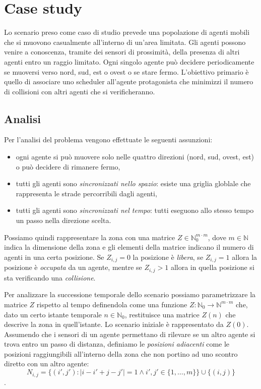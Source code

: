 
\chapter{Case study}


Lo scenario preso come caso di studio prevede una popolazione di agenti mobili che si muovono casualmente all'interno di un'area limitata. Gli agenti possono venire a conoscenza, tramite dei sensori di prossimità, della presenza di altri agenti entro un raggio limitato.
Ogni singolo agente può decidere periodicamente se muoversi verso nord, sud, est o ovest o se stare fermo.
L’obiettivo primario è quello di associare uno scheduler all'agente protagonista che minimizzi il numero di collisioni con altri agenti che si verificheranno.

\section{Analisi}
Per l’analisi del problema vengono effettuate le seguenti assunzioni:
\begin{itemize}
	\item ogni agente si può muovere solo nelle quattro direzioni (nord, sud, ovest, est) o può decidere di rimanere fermo,
	\item tutti gli agenti sono \emph{sincronizzati nello spazio}: esiste una griglia globlale che rappresenta le strade percorribili dagli agenti,
	\item tutti gli agenti sono \emph{sincronizzati nel tempo}: tutti eseguono allo stesso tempo un passo nella direzione scelta.
\end{itemize}

Possiamo quindi rappresentare la zona con una matrice $Z \in \mathbb{N}_0^{m\cdot m}$, dove $m \in \mathbb{N}$ indica la dimensione della zona e gli elementi della matrice indicano il numero di agenti in una certa posizione. Se $Z_{i,j}=0$ la posizione è \emph{libera}, se $Z_{i,j}=1$  allora la posizione è \emph{occupata} da un agente, mentre se $Z_{i,j}>1$ allora in quella posizione si sta verificando una \emph{collisione}.

Per analizzare la successione temporale dello scenario possiamo parametrizzare la matrice $Z$ rispetto al tempo definendola come una funzione $Z:\mathbb{N}_0 \rightarrow \mathbb{N}^{m\cdot m}$ che, dato un certo istante temporale $n \in \mathbb{N}_0$, restituisce una matrice $Z(n)$ che descrive la zona in quell’istante. Lo scenario iniziale è rappresentato da $Z(0)$.
Assumendo che i sensori di un agente permettano di rilevare se un altro agente si trova entro un passo di distanza, definiamo le \emph{posizioni adiacenti} come le posizioni raggiungibili all’interno della zona che non portino ad uno scontro diretto con un altro agente:
$$ N_{i,j} = \{(i',j') : |i-i'+j-j'| = 1 \wedge i',j' \in \{1,\dots,m\}\} \cup \{(i,j)\} $$.

